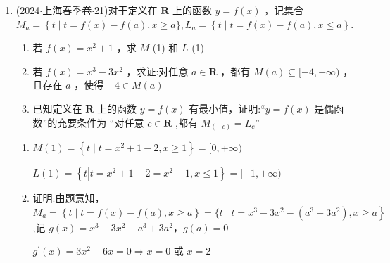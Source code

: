 \begin{enumerate}
\begin{jieda}
\begin{enumerate}
            综上所述，“ $a = 1$ ”是“函数 $y = f\left( x\right)$ 为偶函数”的充要条件.
            \item 当 $a = 1$ 时， $f\left( x\right)  = {{e}}^{x} + {{e}}^{-x}$为偶函数，在$(-\infty, 0)$严减，在$(0, +\infty)$严增，故$f\left( {m + 2}\right)  \leq  f\left( {{2m} - 3}\right) \Longleftrightarrow |m+2| \leq |2m-3| \Longleftrightarrow \left( {{3m} - 1}\right) \left( {m - 5}\right)  \geq  0$，故实数 $m$ 的取值范围是 $\left( {-\infty ,\dfrac{1}{3}}\right\rbrack   \cup  \lbrack 5, + \infty )$.
        \end{enumerate}
    \end{jieda}
    \item (2024$\cdot$上海春季卷$\cdot$21)对于定义在 $\mathbf{R}$ 上的函数 $y = f\left( x\right)$ ，记集合 ${M}_{a} = \left\{  {t \mid  t = f\left( x\right)  - f\left( a\right) ,x \geq  }\right.  a\} ,{L}_{a} = \left\{  {t \mid  t = f\left( x\right)  - f\left( a\right) ,x \leq  a}\right\}$.
    \begin{enumerate}
        \item 若 $f\left( x\right)  = {x}^{2} + 1$ ，求 $M$ (1) 和 $L$ (1)
        \item 若 $f\left( x\right)  = {x}^{3} - 3{x}^{2}$ ，求证:对任意 $a \in  \mathbf{R}$ ，都有 $M\left( a\right)  \subseteq  \lbrack  - 4, + \infty )$ ，且存在 $a$ ，使得 $- 4 \in  M\left( a\right)$
        \item 已知定义在 $\mathbf{R}$ 上的函数 $y = f\left( x\right)$ 有最小值，证明:“$y = f\left( x\right)$ 是偶函数”的充要条件为 “对任意 $c \in  \mathbf{R}$ ,都有 ${M}_{\left( -c\right) } = {L}_{c}$”
    \end{enumerate}
    \begin{jieda}
        \begin{enumerate}
            \item  $M\left( 1\right)  = \left\{  {t \mid  t = {x}^{2} + 1 - 2,x \geq  1}\right\}   = \lbrack 0, + \infty )$
            
            $L\left( 1\right)  = \left\{  {t\left| {t = {x}^{2} + 1 - 2 = {x}^{2} - 1}\right. ,x \leq  1}\right\}   = \lbrack  - 1, + \infty )$
            \item 证明:由题意知， ${M}_{a} = \left\{  {t \mid  t = f\left( x\right)  - f\left( a\right) ,x \geq  a}\right\}   = \{ t \mid  \left. {t = {x}^{3} - 3{x}^{2} - \left( {{a}^{3} - 3{a}^{2}}\right) ,x \geq  a}\right\}$ ,记 $g\left( x\right)  = {x}^{3} - 3{x}^{2} - {a}^{3} +  3{a}^{2}$，$g(a) = 0$
            
            ${g}^{\prime }\left( x\right)  = 3{x}^{2} - {6x} = 0 \Longrightarrow  x = 0$ 或 $x = 2$ 
            

\end{enumerate}
\end{jieda}
\end{enumerate}
